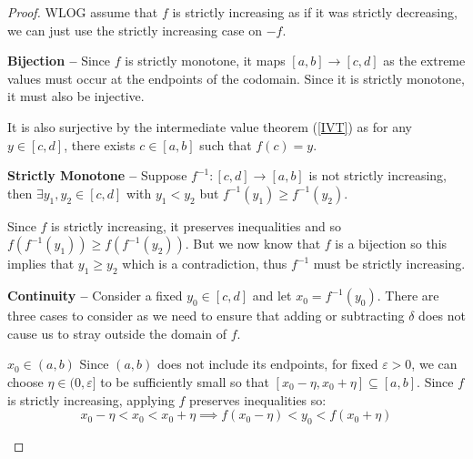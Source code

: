 \documentclass[../main.tex]{subfiles}
\begin{document}
\begin{proof}\par
  WLOG assume that $f$ is strictly increasing as if it was strictly decreasing, we can just use the strictly increasing case on $-f$.

  \textbf{Bijection --} Since $f$ is strictly monotone, it maps $[a, b] \to [c, d]$ as the extreme values must occur at the endpoints of the codomain.
  Since it is strictly monotone, it must also be injective.

  It is also surjective by the intermediate value theorem (\cref{IVT}) as for any $y \in [c, d]$, there exists $c \in [a, b]$ such that $f(c) = y$.

  \textbf{Strictly Monotone --} Suppose $f^{-1}: [c, d] \to [a, b]$ is not strictly increasing, then $\exists y_1, y_2 \in [c, d]$ with $y_1 < y_2$ but $f^{-1}(y_1) \geq f^{-1}(y_2)$.

  Since $f$ is strictly increasing, it preserves inequalities and so $f(f^{-1}(y_1)) \geq f(f^{-1}(y_2))$.
  But we now know that $f$ is a bijection so this implies that $y_1 \geq y_2$ which is a contradiction, thus $f^{-1}$ must be strictly increasing.

  \textbf{Continuity --} Consider a fixed $y_0 \in [c, d]$ and let $x_0 = f^{-1}(y_0)$.
  There are three cases to consider as we need to ensure that adding or subtracting $\delta$ does not cause us to stray outside the domain of $f$.
  \begin{proofcases}
    \begin{case}{$x_0 \in (a, b)$}
      Since $(a, b)$ does not include its endpoints, for fixed $\varepsilon > 0$, we can choose $\eta \in (0, \varepsilon]$ to be sufficiently small so that $[x_0 - \eta, x_0 + \eta] \subseteq [a, b]$.
      Since $f$ is strictly increasing, applying $f$ preserves inequalities so:
      \[
        x_0 - \eta < x_0 < x_0 + \eta \implies f(x_0 - \eta) < y_0 < f(x_0 + \eta)
      \]


\end{case}
\end{proofcases}
\end{proof}
\end{document}
